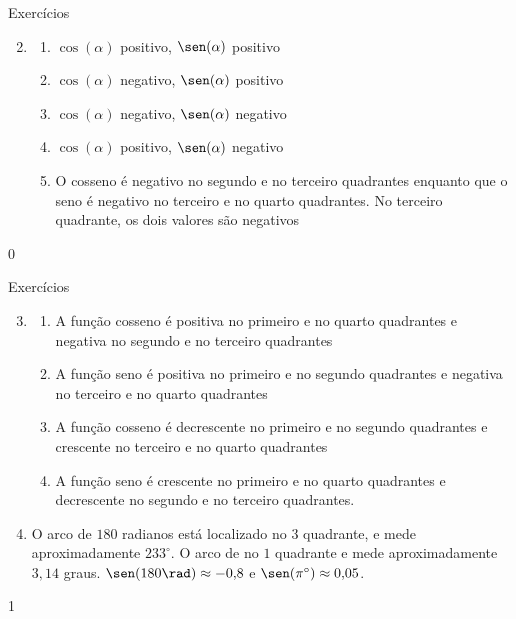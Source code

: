 \marginpar{\vspace{-1em}}
\begin{answer}{Exercícios}
{\exerciselist
\begin{enumerate}\setcounter{enumi}{1}
\item 
\begin{enumerate}
\item $\cos(\alpha)$ positivo, $\sen(\alpha)$ positivo
\item $\cos(\alpha)$ negativo, $\sen(\alpha)$ positivo
\item $\cos(\alpha)$ negativo, $\sen(\alpha)$ negativo
\item $\cos(\alpha)$ positivo, $\sen(\alpha)$ negativo
\item O cosseno é negativo no segundo e no terceiro quadrantes enquanto que o seno é negativo no terceiro e no quarto quadrantes. No terceiro quadrante, os dois valores são negativos
\end{enumerate}
\end{enumerate}
}{0}
\end{answer}
\clearmargin
\begin{answer}{Exercícios}
{\exerciselist
\begin{enumerate}\setcounter{enumi}{2}
\item 
\begin{enumerate}
\item A função cosseno é positiva no primeiro e no quarto quadrantes e negativa no segundo e no terceiro quadrantes
\item A função seno é positiva no primeiro e no segundo quadrantes e negativa no terceiro e no quarto quadrantes
\item A função cosseno é decrescente no primeiro e no segundo quadrantes e crescente no terceiro e no quarto quadrantes
\item A função seno é crescente no primeiro e no quarto quadrantes e decrescente no segundo e no terceiro quadrantes.
\end{enumerate}
\item O arco de $180$ radianos está localizado no $3$ quadrante, e mede aproximadamente $233^{\circ}$. O arco de no $1$ quadrante e mede aproximadamente $3{,}14$ graus. $\sen(180\rad)\approx-0{,}8$ e $\sen(\pi^{\circ})\approx0{,}05$.
\end{enumerate}
}{1}
\end{answer}
\marginpar{\hrulefill}
\def\currentcolor{session3}
